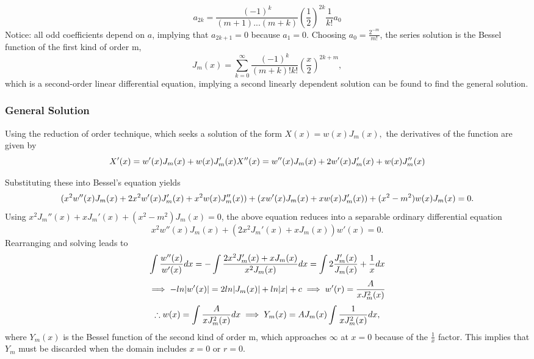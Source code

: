 \documentclass{article}
\begin{document}
\begin{equation*}
a_{2k}=\frac{(-1)^k}{(m+1) . . . (m+k)}(\frac{1}{2})^{2k}\frac{1}{k!}a_0
\end{equation*}Notice: all odd coefficients depend on $a$, implying that $a_{2k+1}=0$ because $a_1=0$. Choosing $a_0 = \frac{2^{-m}}{m!}$, the series solution is the Bessel function of the first kind of order m,
\begin{equation*}
J_m(x)=\sum_{k=0}^{\infty} \frac{(-1)^k}{(m+k)!k!}(\frac{x}{2})^{2k+m},
\end{equation*}
which is a second-order linear differential equation, implying a second linearly dependent solution can be found to find the general solution. 

\subsubsection{General Solution}
Using the reduction of order technique, which seeks a solution of the form $X(x)=w(x)J_m(x),$ the derivatives of the function are given by\begin{equation*}
X'(x)=w'(x)J_m(x)+w(x)J_m'(x)  \newline X''(x)=w''(x)J_m(x)+2w'(x)J_m'(x)+w(x)J_m''(x)
\end{equation*}

Substituting these into Bessel's equation yields
\begin{equation*}
(x^2 w''(x)J_m(x)+2x^2 w'(x)J_m'(x)+x^2w(x)J_m''(x))\newline + (xw'(x)J_m(x)+xw(x)J_m'(x))+(x^2-m^2)w(x)J_m(x)=0.
\end{equation*}
Using $x^2J_m''(x)+xJ_m'(x)+(x^2-m^2)J_m(x)=0$, the above equation reduces into a separable ordinary differential equation
\begin{equation*}
x^2w''(x)J_m(x)+(2x^2 J_m'(x)+xJ_m(x))w'(x)=0.
\end{equation*}
Rearranging and solving leads to\begin{equation*}
 \int \frac{w''(x)}{w'(x)}dx = -\int \frac{2x^2J_m'(x)+xJ_m(x)}{x^2 J_m(x)}dx = \int 2\frac{J_m'(x)}{J_m(x)}+\frac{1}{x}dx \newline
\end{equation*}
\begin{equation*}
 \implies -ln |w'(x)|=2ln|J_m(x)|+ln|x|+c \implies w'(r)=\frac{A}{xJ_{m}^2 (x)} \newline
\end{equation*}
\begin{equation*}
 \therefore w(x)=\int\frac{A}{xJ_{m}^{2}(x)}dx \newline \implies Y_m(x)=AJ_m(x)\int\frac{1}{xJ_{m}^{2}(x)}dx,
\end{equation*}
where $Y_m(x)$ is the Bessel function of the second kind of order m, which approaches $\infty$ at $x=0$ because of the $\frac{1}{x}$ factor. This implies that $Y_m$ must be discarded when the domain includes $x=0$ or $r=0$.
\end{document}
